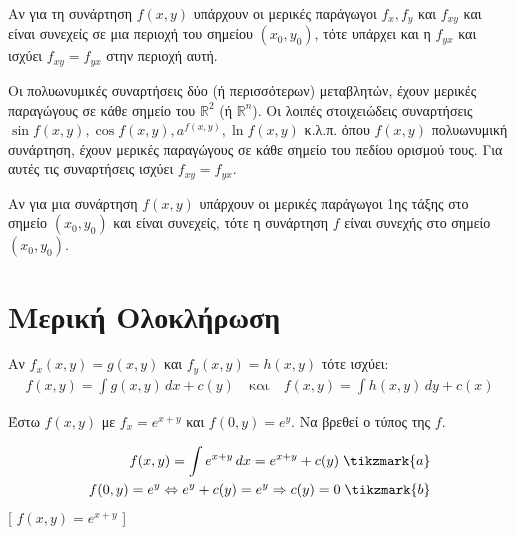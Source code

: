     \begin{thm}
    \item {}
        Αν για τη συνάρτηση $ f(x,y) $ υπάρχουν οι μερικές παράγωγοι $ f_{x}, f_{y} $ και $ f_{xy} $ και
        είναι συνεχείς σε μια περιοχή του σημείου $ (x_{0}, y_{0}) $, τότε υπάρχει και η $
        f_{yx} $ και
        ισχύει $ f_{xy}=f_{yx} $ στην περιοχή αυτή.
    \end{thm}



    \begin{rem}
    \item {}
        Οι πολυωνυμικές συναρτήσεις δύο (ή περισσότερων) μεταβλητών, 
        έχουν μερικές παραγώγους σε κάθε σημείο του $ \mathbb{R}^{2} $ (ή $\mathbb{R}^{n}$). Οι λοιπές
        στοιχειώδεις συναρτήσεις $ \sin{f(x,y)}, \cos{f(x,y)}, a^{f(x,y)}, \ln{f(x,y)} $ κ.λ.π. όπου $
        f(x,y) $ πολυωνυμική συνάρτηση, έχουν μερικές παραγώγους σε κάθε σημείο του πεδίου ορισμού τους.
        Για αυτές τις συναρτήσεις ισχύει $ f_{xy}=f_{yx} $.
    \end{rem}

    \begin{prop}
        Αν για μια συνάρτηση $ f(x,y)$ υπάρχουν οι μερικές παράγωγοι 1ης τάξης στο σημείο $ (x_{0},
        y_{0}) $ και είναι συνεχείς, τότε η συνάρτηση $f$ είναι συνεχής στο σημείο $ (x_{0}, y_{0}) $.
    \end{prop}



    \section{Μερική Ολοκλήρωση}

    \begin{rem}
    \item {}
        Αν $ f_{x}(x,y) = g(x,y)$ και $ f_{y}(x,y)=h(x,y) $ τότε ισχύει:
        \begin{align*}
            f(x,y) = \int g(x,y) \,{dx} + c(y) \quad \text{και} \quad f(x,y) = \int h(x,y) \,{dy} + c(x) 
        \end{align*} 
    \end{rem}

    \begin{example}
    \item {}
        Έστω $ f(x,y)$ με $ f_{x}=e^{x+y} $ και $ f(0,y)=e^{y} $. Να βρεθεί ο τύπος της $f$.
        \begin{solution}
            \begin{align*}
                f(x,y) = \int e^{x+y} \,{dx} = e^{x+y} + c(y) \; \tikzmark{a} \\ 
                f(0,y) = e^{y} \Leftrightarrow e^{y}+ c(y) = e^{y} \Rightarrow c(y) = 0 \; \tikzmark{b}
            \end{align*}
            [ $f(x,y) = e^{x+y}$ ]
        \end{solution}
    \end{example}

